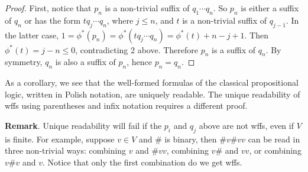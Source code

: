 \documentclass[12pt]{article}
\begin{document}
\begin{proof}
First, notice that $p_n$ is a non-trivial suffix of $q_1 \cdots q_n$.  So $p_n$ is either a suffix of $q_n$ or has the form $t q_j \cdots q_n$, where $j\le n$, and $t$ is a non-trivial suffix of $q_{j-1}$.  In the latter case, $1 = \phi^*(p_n) = \phi^*(t q_j \cdots q_n)= \phi^*(t) + n-j+1$.  Then $\phi^*(t) = j-n \le 0$, contradicting 2 above.  Therefore $p_n$ is a suffix of $q_n$.  By symmetry, $q_n$ is also a suffix of $p_n$, hence $p_n=q_n$.
\end{proof}

As a corollary, we see that the well-formed formulas of the classical propositional logic, written in Polish notation, are uniquely readable.  The unique readability of wffs using parentheses and infix notation requires a different proof.

\textbf{Remark}.  Unique readability will fail if the $p_i$ and $q_j$ above are not wffs, even if $V$ is finite.  For example, suppose $v\in V$ and $\#$ is binary, then $\# v \# vv$ can be read in three non-trivial ways: combining $v$ and $\#vv$, combining $v\#$ and $vv$, or combining $v\#v$ and $v$.  Notice that only the first combination do we get wffs.
\end{document}
